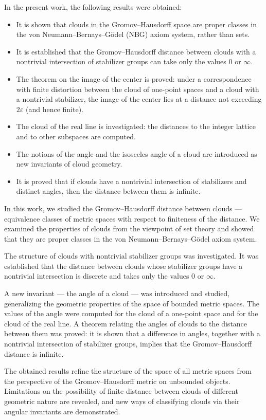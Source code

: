 In the present work, the following results were obtained:
\begin{itemize}
  \item It is shown that clouds in the Gromov--Hausdorff space are
    proper classes in the von Neumann--Bernays--G\"odel (NBG) axiom
    system, rather than sets.
  \item It is established that the Gromov--Hausdorff distance between
    clouds with a nontrivial intersection of stabilizer groups can
    take only the values \(0\) or \(\infty\).
  \item The theorem on the image of the center is proved: under a
    correspondence with finite distortion between the cloud of
    one-point spaces and a cloud with a nontrivial stabilizer, the
    image of the center lies at a distance not exceeding
    \(2\varepsilon\) (and hence finite).
  \item The cloud of the real line is investigated: the distances to
    the integer lattice and to other subspaces are computed.
  \item The notions of the angle and the isosceles angle of a cloud
    are introduced as new invariants of cloud geometry.
  \item It is proved that if clouds have a nontrivial intersection of
    stabilizers and distinct angles, then the distance between
    them is infinite.
\end{itemize}

In this work, we studied the Gromov--Hausdorff distance between
clouds --- equivalence classes of metric spaces with respect to
finiteness of the distance. We examined the properties of clouds from
the viewpoint of set theory and showed that they are proper classes
in the von Neumann--Bernays--G\"odel axiom system.

The structure of clouds with nontrivial stabilizer groups was
investigated. It was established that the distance between clouds
whose stabilizer groups have a nontrivial intersection is discrete
and takes only the values \(0\) or \(\infty\).

A new invariant --- the angle of a cloud --- was introduced and
studied, generalizing the geometric properties of the space of
bounded metric spaces. The values of the angle were computed for the
cloud of a one-point space and for the cloud of the real line. A
theorem relating the angles of clouds to the distance between them
was proved: it is shown that a difference in angles, together with a
nontrivial intersection of stabilizer groups, implies that the
Gromov--Hausdorff distance is infinite.

The obtained results refine the structure of the space of all metric
spaces from the perspective of the Gromov--Hausdorff metric on
unbounded objects. Limitations on the possibility of finite distance
between clouds of different geometric nature are revealed, and new
ways of classifying clouds via their angular invariants are demonstrated.
